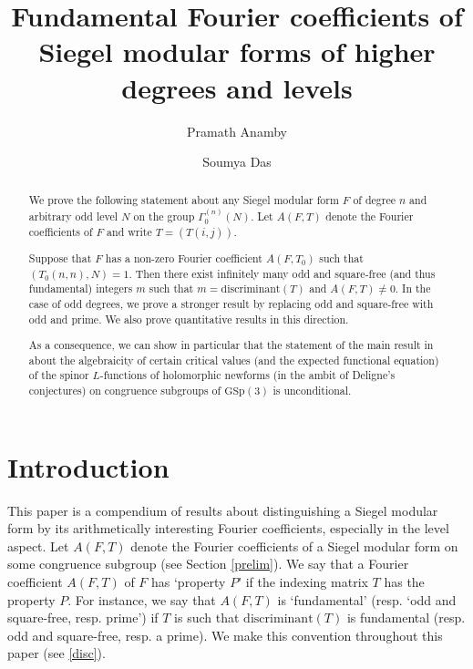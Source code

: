 \documentclass[11pt]{amsart}
\author{Pramath Anamby }
\author{Soumya Das}
\date{}
\numberwithin{equation}{section}
\newcommand{\mrm}{\mathrm} %
\begin{document}
\title[Fundamental Fourier coefficients]{Fundamental Fourier coefficients of Siegel modular forms of higher degrees and levels}

\begin{abstract}
    We prove the following statement about any Siegel modular form $F$ of degree $n$ and arbitrary odd level $N$ on the group $\Gamma_{0}^{(n)}(N)$. Let $A(F,T)$ denote the Fourier coefficients of $F$ and write $T=(T(i,j))$. 
    
    Suppose that $F$ has  a non-zero Fourier coefficient $A(F,T_0)$ such that $(T_0(n,n),N)=1$. Then there exist infinitely many odd and square-free (and thus fundamental) integers $m$ such that $m=\mrm{discriminant}(T)$ and $A(F,T)\neq 0$. In the case of odd degrees, we prove a stronger result by replacing odd and square-free with odd and prime. We also prove quantitative results in this direction.

    As a consequence, we can show in particular that the statement of the main result in \cite{eischen2024algebraicity} about the algebraicity of certain critical values (and the expected functional equation) of the spinor $L$-functions of holomorphic newforms (in the ambit of Deligne's conjectures) on congruence subgroups of $\mrm{GSp}(3)$ is unconditional.
\end{abstract}
\maketitle

\section{Introduction}

This paper is a compendium of results about distinguishing a Siegel modular form by its arithmetically interesting Fourier coefficients, especially in the level aspect. Let $A(F,T)$ denote the Fourier coefficients of a Siegel modular form on some congruence subgroup (see Section \ref{prelim}). We say that a Fourier coefficient $A(F,T)$ of  $F$ has `property $P$' if the indexing matrix $T$ has the property $P$. For instance, we say that $A(F,T)$ is  `fundamental' (resp. `odd and square-free, resp. prime') if $T$ is such that $\mrm{discriminant}(T)$ is fundamental (resp. odd and square-free, resp. a prime). We make this convention throughout this paper (see \eqref{disc}).
\end{document}
